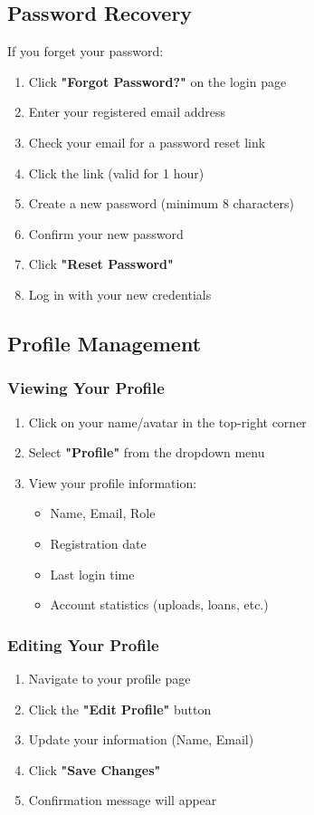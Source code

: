 \documentclass[12pt,a4paper]{article}
\begin{document}
\subsection{Password Recovery}
If you forget your password:
\begin{enumerate}[leftmargin=*]
    \item Click \textbf{"Forgot Password?"} on the login page
    \item Enter your registered email address
    \item Check your email for a password reset link
    \item Click the link (valid for 1 hour)
    \item Create a new password (minimum 8 characters)
    \item Confirm your new password
    \item Click \textbf{"Reset Password"}
    \item Log in with your new credentials
\end{enumerate}

\subsection{Profile Management}

\subsubsection{Viewing Your Profile}
\begin{enumerate}[leftmargin=*]
    \item Click on your name/avatar in the top-right corner
    \item Select \textbf{"Profile"} from the dropdown menu
    \item View your profile information:
        \begin{itemize}
            \item Name, Email, Role
            \item Registration date
            \item Last login time
            \item Account statistics (uploads, loans, etc.)
        \end{itemize}
\end{enumerate}

\subsubsection{Editing Your Profile}
\begin{enumerate}[leftmargin=*]
    \item Navigate to your profile page
    \item Click the \textbf{"Edit Profile"} button
    \item Update your information (Name, Email)
    \item Click \textbf{"Save Changes"}
    \item Confirmation message will appear
\end{enumerate}
\end{document}
